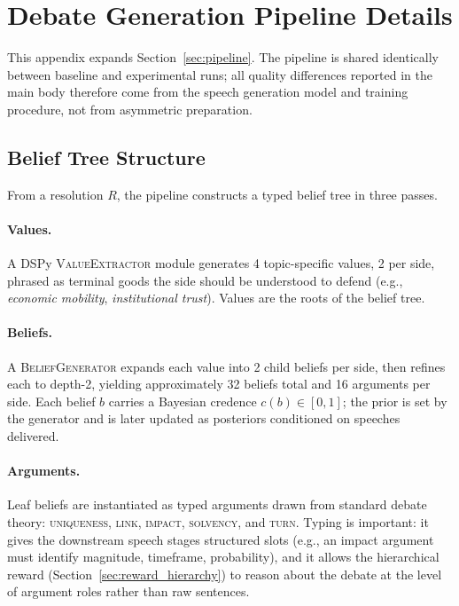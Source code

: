 \section{Debate Generation Pipeline Details}
\label{app:pipeline}

This appendix expands Section~\ref{sec:pipeline}. The pipeline is shared
identically between baseline and experimental runs; all quality differences
reported in the main body therefore come from the speech generation model
and training procedure, not from asymmetric preparation.

\subsection{Belief Tree Structure}

From a resolution $R$, the pipeline constructs a typed belief tree in three
passes.

\paragraph{Values.}
A DSPy \textsc{ValueExtractor} module generates 4 topic-specific values,
2 per side, phrased as terminal goods the side should be understood to
defend (e.g., \emph{economic mobility}, \emph{institutional trust}).
Values are the roots of the belief tree.

\paragraph{Beliefs.}
A \textsc{BeliefGenerator} expands each value into 2 child beliefs per
side, then refines each to depth-2, yielding approximately 32 beliefs
total and 16 arguments per side. Each belief $b$ carries a Bayesian
credence $c(b)\in[0,1]$; the prior is set by the generator and is later
updated as posteriors conditioned on speeches delivered.

\paragraph{Arguments.}
Leaf beliefs are instantiated as typed arguments drawn from standard
debate theory: \textsc{uniqueness}, \textsc{link}, \textsc{impact},
\textsc{solvency}, and \textsc{turn}. Typing is important: it gives the
downstream speech stages structured slots (e.g., an impact argument must
identify magnitude, timeframe, probability), and it allows the hierarchical
reward (Section~\ref{sec:reward_hierarchy}) to reason about the debate at
the level of argument roles rather than raw sentences.

